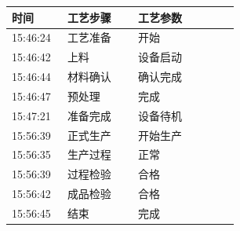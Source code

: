 \documentclass[UTF8,10pt,a4paper,fontset=fandol]{ctexart}
\newcommand{\fieldvalue}[1]{#1}
\begin{document}
\begin{tabular}{p{0.22\linewidth}p{0.28\linewidth}p{0.40\linewidth}}
\textbf{时间} & \textbf{工艺步骤} & \textbf{工艺参数} \\ \hline
\fieldvalue{15:46:24}
&
\fieldvalue{工艺准备}
&
\fieldvalue{开始} \\

\fieldvalue{15:46:42}
&
\fieldvalue{上料}
&
\fieldvalue{设备启动} \\

\fieldvalue{15:46:44}
&
\fieldvalue{材料确认}
&
\fieldvalue{确认完成} \\

\fieldvalue{15:46:47}
&
\fieldvalue{预处理}
&
\fieldvalue{完成} \\

\fieldvalue{15:47:21}
&
\fieldvalue{准备完成}
&
\fieldvalue{设备待机} \\

\fieldvalue{15:56:39}
&
\fieldvalue{正式生产}
&
\fieldvalue{开始生产} \\

\fieldvalue{15:56:35}
&
\fieldvalue{生产过程}
&
\fieldvalue{正常} \\

\fieldvalue{15:56:39}
&
\fieldvalue{过程检验}
&
\fieldvalue{合格} \\

\fieldvalue{15:56:42}
&
\fieldvalue{成品检验}
&
\fieldvalue{合格} \\

\fieldvalue{15:56:45}
&
\fieldvalue{结束}
&
\fieldvalue{完成} \\
\end{tabular}
\end{document}
